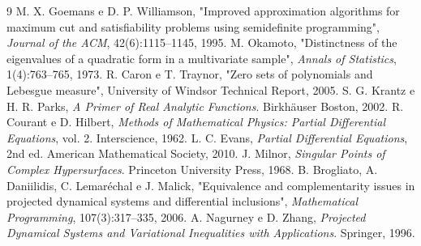 \documentclass[11pt,a4paper]{article}
\begin{document}
\begin{thebibliography}{9}
 M. X. Goemans e D. P. Williamson, "Improved approximation algorithms for maximum cut and satisfiability problems using semidefinite programming", \emph{Journal of the ACM}, 42(6):1115--1145, 1995.
 M. Okamoto, "Distinctness of the eigenvalues of a quadratic form in a multivariate sample", \emph{Annals of Statistics}, 1(4):763--765, 1973.
 R. Caron e T. Traynor, "Zero sets of polynomials and Lebesgue measure", University of Windsor Technical Report, 2005.
 S. G. Krantz e H. R. Parks, \emph{A Primer of Real Analytic Functions}. Birkh\"auser Boston, 2002.
 R. Courant e D. Hilbert, \emph{Methods of Mathematical Physics: Partial Differential Equations}, vol. 2. Interscience, 1962.
 L. C. Evans, \emph{Partial Differential Equations}, 2nd ed. American Mathematical Society, 2010.
 J. Milnor, \emph{Singular Points of Complex Hypersurfaces}. Princeton University Press, 1968.
 B. Brogliato, A. Daniilidis, C. Lemar\'echal e J. Malick, "Equivalence and complementarity issues in projected dynamical systems and differential inclusions", \emph{Mathematical Programming}, 107(3):317--335, 2006.
 A. Nagurney e D. Zhang, \emph{Projected Dynamical Systems and Variational Inequalities with Applications}. Springer, 1996.
\end{thebibliography}
\end{document}
